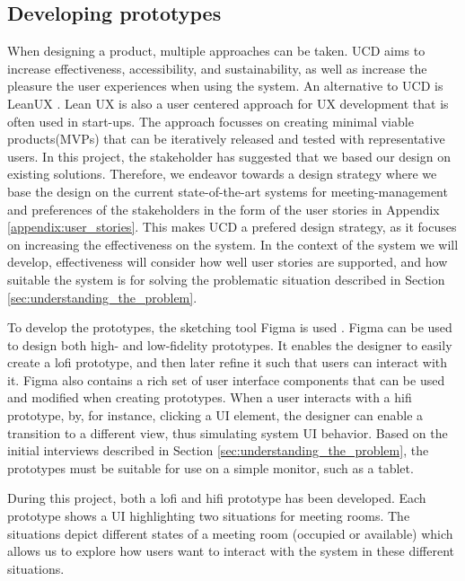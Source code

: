 \subsection{Developing prototypes}\label{subsec:develop_proto}
When designing a product, multiple approaches can be taken.  
UCD aims to increase effectiveness, accessibility, and sustainability, as well as increase the pleasure the user experiences when using the system\cite{user-centred-design}. 
An alternative to UCD is LeanUX \cite{Lean_UX}.
Lean UX is also a user centered approach for UX development that is often used in start-ups.
The approach focusses on creating minimal viable products(MVPs) that can be iteratively released and tested with representative users. 
In this project, the stakeholder has suggested that we based our design on existing solutions.
Therefore, we endeavor towards a design strategy where we base the design on the current state-of-the-art systems for meeting-management and preferences of the stakeholders in the form of the user stories in Appendix \ref{appendix:user_stories}.
This makes UCD a prefered design strategy, as it focuses on increasing the effectiveness on the system.
In the context of the system we will develop, effectiveness will consider how well user stories are supported, and how suitable the system is for solving the problematic situation described in Section \ref{sec:understanding_the_problem}.

To develop the prototypes, the sketching tool Figma is used \cite{Figma}.
Figma can be used to design both high- and low-fidelity prototypes. 
It enables the designer to easily create a lofi prototype, and then later refine it such that users can interact with it.
Figma also contains a rich set of user interface components that can be used and modified when creating prototypes.
When a user interacts with a hifi prototype, by, for instance, clicking a UI element, the designer can enable a transition to a different view, thus simulating system UI behavior.
Based on the initial interviews described in Section \ref{sec:understanding_the_problem}, the prototypes must be suitable for use on a simple monitor, such as a tablet.

During this project, both a lofi and hifi prototype has been developed.
Each prototype shows a UI highlighting two situations for meeting rooms. 
The situations depict different states of a meeting room (occupied or available) which allows us to explore how users want to interact with the system in these different situations. 


